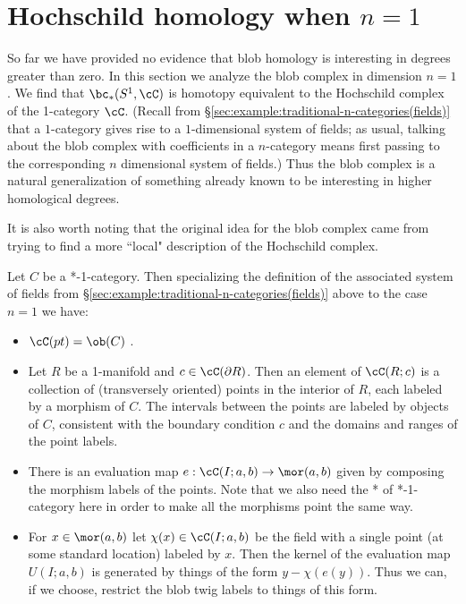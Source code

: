
\section{Hochschild homology when \texorpdfstring{$n=1$}{n=1}}
\label{sec:hochschild}

So far we have provided no evidence that blob homology is interesting in degrees 
greater than zero.
In this section we analyze the blob complex in dimension $n=1$.
We find that $\bc_*(S^1, \cC)$ is homotopy equivalent to the 
Hochschild complex of the 1-category $\cC$.
(Recall from \S \ref{sec:example:traditional-n-categories(fields)} that a 
$1$-category gives rise to a $1$-dimensional system of fields; as usual, 
talking about the blob complex with coefficients in a $n$-category means 
first passing to the corresponding $n$ dimensional system of fields.)
Thus the blob complex is a natural generalization of something already
known to be interesting in higher homological degrees.

It is also worth noting that the original idea for the blob complex came from trying
to find a more ``local" description of the Hochschild complex.

Let $C$ be a *-1-category.
Then specializing the definition of the associated system of fields from \S \ref{sec:example:traditional-n-categories(fields)} above to the case $n=1$ we have:
\begin{itemize}
\item $\cC(pt) = \ob(C)$ .
\item Let $R$ be a 1-manifold and $c \in \cC(\bd R)$.
Then an element of $\cC(R; c)$ is a collection of (transversely oriented)
points in the interior
of $R$, each labeled by a morphism of $C$.
The intervals between the points are labeled by objects of $C$, consistent with
the boundary condition $c$ and the domains and ranges of the point labels.
\item There is an evaluation map $e: \cC(I; a, b) \to \mor(a, b)$ given by
composing the morphism labels of the points.
Note that we also need the * of *-1-category here in order to make all the morphisms point
the same way.
\item For $x \in \mor(a, b)$ let $\chi(x) \in \cC(I; a, b)$ be the field with a single
point (at some standard location) labeled by $x$.
Then the kernel of the evaluation map $U(I; a, b)$ is generated by things of the
form $y - \chi(e(y))$.
Thus we can, if we choose, restrict the blob twig labels to things of this form.
\end{itemize}

